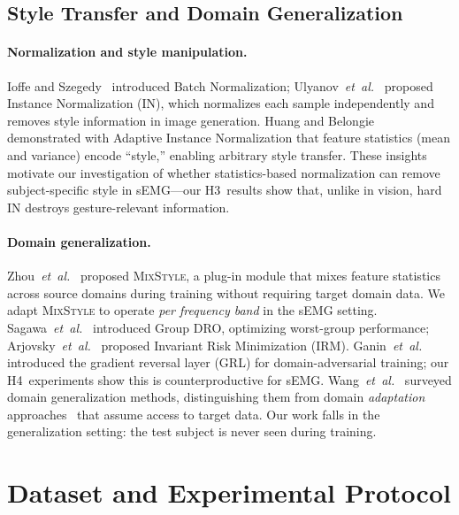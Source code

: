 \documentclass[conference]{IEEEtran}
\newcommand{\etal}{\mbox{\textit{et~al.}}}
\newcommand{\mixstyle}{\textsc{MixStyle}}
\begin{document}
\subsection{Style Transfer and Domain Generalization}

\paragraph{Normalization and style manipulation.}
Ioffe and Szegedy~\cite{ioffe2015batch} introduced Batch Normalization; Ulyanov~\etal~\cite{ulyanov2016instance} proposed Instance Normalization (IN), which normalizes each sample independently and removes style information in image generation.
Huang and Belongie~\cite{huang2017adain} demonstrated with Adaptive Instance Normalization that feature statistics (mean and variance) encode ``style,'' enabling arbitrary style transfer.
These insights motivate our investigation of whether statistics-based normalization can remove subject-specific style in sEMG---our H3~results show that, unlike in vision, hard IN destroys gesture-relevant information.

\paragraph{Domain generalization.}
Zhou~\etal~\cite{zhou2021mixstyle} proposed \mixstyle{}, a plug-in module that mixes feature statistics across source domains during training without requiring target domain data.
We adapt \mixstyle{} to operate \emph{per frequency band} in the sEMG setting.
Sagawa~\etal~\cite{sagawa2020distributionally} introduced Group DRO, optimizing worst-group performance; Arjovsky~\etal~\cite{arjovsky2019invariant} proposed Invariant Risk Minimization (IRM).
Ganin~\etal~\cite{ganin2016domain} introduced the gradient reversal layer (GRL) for domain-adversarial training; our H4~experiments show this is counterproductive for sEMG.
Wang~\etal~\cite{wang2022generalizing} surveyed domain generalization methods, distinguishing them from domain \emph{adaptation} approaches~\cite{du2017surface, ketyko2019domain} that assume access to target data.
Our work falls in the generalization setting: the test subject is never seen during training.

\section{Dataset and Experimental Protocol}
\label{sec:dataset}
\end{document}
